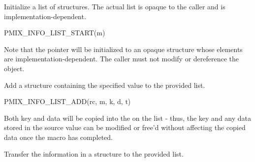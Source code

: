 
Initialize a list of  structures. The actual list is opaque to the caller and is implementation-dependent.

\cspecificstart
\begin{codepar}
PMIX_INFO_LIST_START(m)
\end{codepar}
\cspecificend

\begin{arglist}
\end{arglist}

Note that the pointer will be initialized to an opaque structure whose elements are implementation-dependent. The caller must not modify or dereference the object.


Add a  structure containing the specified value to the provided list.

\cspecificstart
\begin{codepar}
PMIX_INFO_LIST_ADD(rc, m, k, d, t)
\end{codepar}
\cspecificend

\begin{arglist}
\end{arglist}

\adviceuserstart
Both key and data will be copied into the  on the list - thus, the key and any data stored in the source value can be modified or free'd without affecting the copied data once the macro has completed.
\adviceuserend


Transfer the information in a  structure to the provided list.

